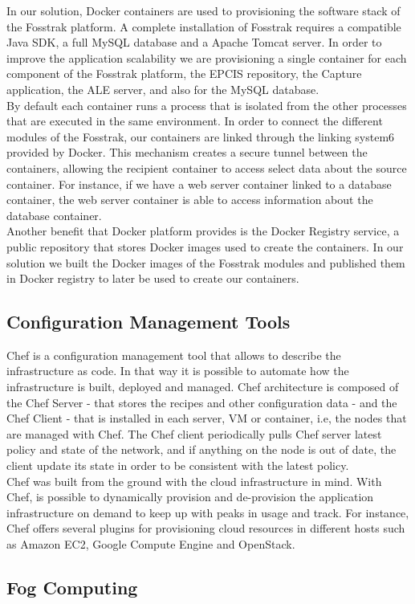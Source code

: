 In our solution, Docker containers are used to provisioning the software stack of the Fosstrak platform.
A complete installation of Fosstrak requires a compatible Java SDK, a full MySQL database and a Apache
Tomcat server. In order to improve the application scalability we are provisioning a single container
for each component of the Fosstrak platform, the EPCIS repository, the Capture application, the ALE
server, and also for the MySQL database.\\

By default each container runs a process that is isolated from the other processes that are executed
in the same environment. In order to connect the different modules of the Fosstrak, our containers are
linked through the linking system6 provided by Docker. This mechanism creates a secure tunnel between the
containers, allowing the recipient container to access select data about the source container. For instance,
if we have a web server container linked to a database container, the web server container is able to access
information about the database container.\\

Another benefit that Docker platform provides is the Docker Registry service, a public repository
that stores Docker images used to create the containers. In our solution we built the Docker images
of the Fosstrak modules and published them in Docker registry to later be used to create our containers.

\subsection{Configuration Management Tools}
\label{sub:cm_tools}
Chef is a configuration management tool that allows to describe the infrastructure as code.
In that way it is possible to automate how the infrastructure is built, deployed and managed.
Chef architecture is composed of the Chef Server - that stores the recipes and other configuration
data - and the Chef Client - that is installed in each server, VM or container, i.e, the nodes that
are managed with Chef. The Chef client periodically pulls Chef server latest policy and state of the
network, and if anything on the node is out of date, the client update its state in order to be
consistent with the latest policy.\\

Chef was built from the ground with the cloud infrastructure in mind. With Chef, is possible to
dynamically provision and de-provision the application infrastructure on demand to keep up with
peaks in usage and track. For instance, Chef offers several plugins for provisioning cloud resources
in different hosts such as Amazon EC2, Google Compute Engine and OpenStack.

\subsection{Fog Computing}
\label{sub:Fog Computing}
